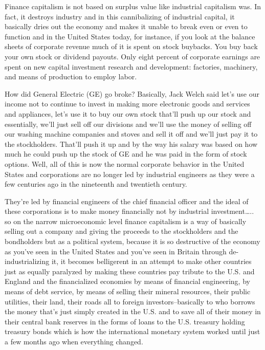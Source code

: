 \documentclass[
]{book}
\begin{document}
Finance capitalism is not based on surplus value like industrial
capitalism was. In fact, it destroys industry and in this cannibalizing of
industrial capital, it basically dries out the economy and makes it
unable to break even or even to function and in the United States
today, for instance, if you look at the balance sheets of corporate
revenue much of it is spent on stock buybacks. You buy back your own
stock or dividend payouts. Only eight percent of corporate earnings
are spent on new capital investment research and development:
factories, machinery, and means of production to employ labor.

How did General Electric (GE) go broke? Basically, Jack Welch said
let's use our income not to continue to invest in making more
electronic goods and services and appliances, let's use it to buy our
own stock that'll push up our stock and essentially, we'll just sell off our
divisions and we'll use the money of selling off our washing machine
companies and stoves and sell it off and we'll just pay it to the
stockholders. That'll push it up and by the way his salary was based
on how much he could push up the stock of GE and he was paid in the
form of stock options. Well, all of this is now the normal corporate
behavior in the United States and corporations are no longer led by
industrial engineers as they were a few centuries ago in the nineteenth
and twentieth century.

They're led by financial engineers of the chief financial officer and the
ideal of these corporations is to make money financially not by
industrial investment\ldots.. so on the narrow microeconomic level finance
capitalism is a way of basically selling out a company and giving the
proceeds to the stockholders and the bondholders but as a political
system, because it is so destructive of the economy as you've seen in
the United States and you've seen in Britain through de-industrializing
it, it becomes belligerent in an attempt to make other countries just as
equally paralyzed by making these countries pay tribute to the U.S.
and England and the financialized economies by means of financial
engineering, by means of debt service, by means of selling their
mineral resources, their public utilities, their land, their roads all to
foreign investors--basically to who borrows the money that's just simply
created in the U.S. and to save all of their money in their central bank
reserves in the forms of loans to the U.S. treasury holding treasury
bonds which is how the international monetary system worked until
just a few months ago when everything changed.
\end{document}
